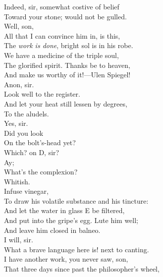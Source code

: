 \documentclass[a4paper,oneside,12pt]{memoir}
\begin{document}
\begin{drama*}
Indeed, sir, somewhat costive of belief\\
Toward your stone; would not be gulled.\\
\subtlespeaks {} Well, son,\\
All that I can convince him in, is this,\\
The \emph{work is done}, bright sol is in his robe.\\
We have a medicine of the triple soul,\\
The glorified spirit. Thanks be to heaven,\\
And make us worthy of it!---Ulen Spiegel!\\
\facespeaks {} Anon, sir.\\
\subtlespeaks {} Look well to the register.\\
And let your heat still lessen by degrees,\\
To the aludels.\\
\facespeaks {} Yes, sir.\\
\subtlespeaks {} Did you look\\
On the bolt's-head yet?\\
\facespeaks {} Which? on D, sir?\\
\subtlespeaks {} Ay;\\
What's the complexion?\\
\facespeaks {} Whitish.\\
\subtlespeaks {} Infuse vinegar,\\
To draw his volatile substance and his tincture:\\
And let the water in glass E be filtered,\\
And put into the gripe's egg. Lute him well;\\
And leave him closed in balneo.\\
\facespeaks {} I will, sir.\\
\surlyspeaks What a brave language here is! next to canting.\\
\subtlespeaks I have another work, you never saw, son,\\
That three days since past the philosopher's wheel,\\

\end{drama*}
\end{document}
